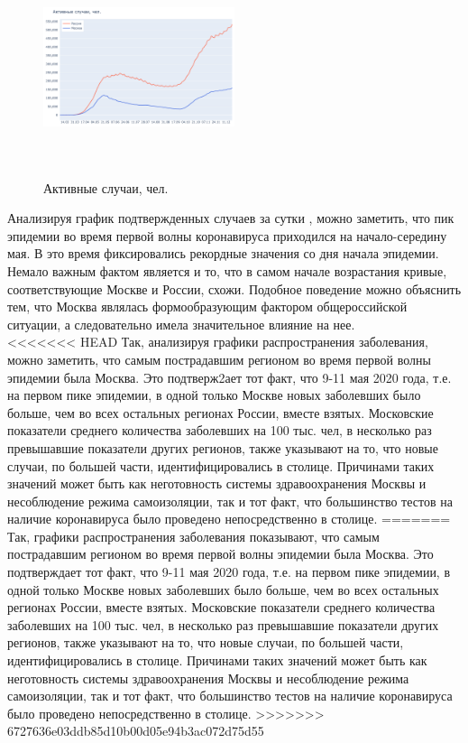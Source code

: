\documentclass[a4paper, 12pt]{extarticle}
\begin{document}
\begin{figure}
    \centering
    \vspace{-20pt}
    \includegraphics[height=180pt, width=0.50\textwidth]{../plots/2active_cases_russia_moscow.pdf}
    \caption{Активные случаи, чел.}
    \label{fig:day_active_russia_moscow}
\end{figure}

Анализируя график подтвержденных случаев за сутки
, можно заметить, что пик эпидемии
во время первой волны коронавируса приходился на начало-середину мая. В это
время фиксировались рекордные значения со дня начала эпидемии. Немало важным
фактом является и то, что в самом начале возрастания кривые, соответствующие
Москве и России, схожи. Подобное поведение можно объяснить тем, что Москва
являлась формообразующим фактором общероссийской ситуации, а следовательно
имела значительное влияние на нее.
\\

<<<<<<< HEAD
Так, анализируя графики распространения заболевания, можно заметить, что самым
пострадавшим регионом во время первой волны эпидемии была Москва. Это
подтверж2ает тот факт, что 9-11 мая 2020 года, т.е. на первом пике эпидемии, в
одной только Москве новых заболевших было больше, чем во всех остальных
регионах России, вместе взятых. Московские показатели среднего количества
заболевших на 100 тыс. чел, в несколько раз превышавшие показатели других
регионов, также указывают на то, что новые случаи, по большей части,
идентифицировались в столице. Причинами таких значений может быть как
неготовность системы здравоохранения Москвы и несоблюдение режима самоизоляции,
так и тот факт, что большинство тестов на наличие коронавируса было проведено
непосредственно в столице.
=======
Так, графики распространения заболевания показывают, что самым пострадавшим регионом во время первой волны эпидемии была Москва. Это подтверждает тот факт, что 9-11 мая 2020 года, т.е. на первом пике эпидемии, в одной только Москве новых заболевших было больше, чем во всех остальных регионах России, вместе взятых. Московские показатели среднего количества заболевших на 100 тыс. чел, в несколько раз превышавшие показатели других регионов, также указывают на то, что новые случаи, по большей части, идентифицировались в столице. Причинами таких значений может быть как неготовность системы здравоохранения Москвы и несоблюдение режима самоизоляции, так и тот факт, что большинство тестов на наличие коронавируса было проведено непосредственно в столице.
>>>>>>> 6727636e03ddb85d10b00d05e94b3ac072d75d55
\end{document}
